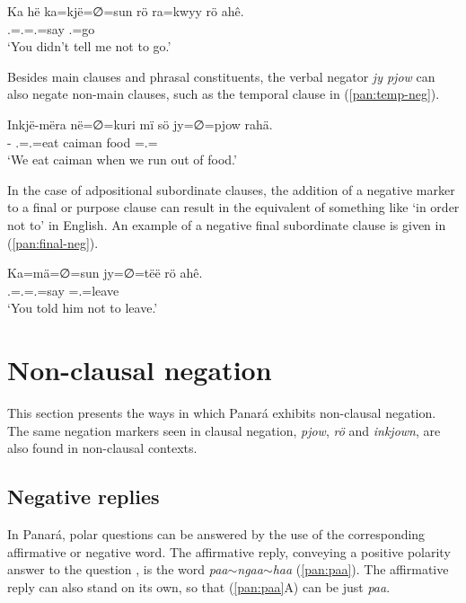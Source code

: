 \documentclass[output=paper,colorlinks,citecolor=brown,draft]{langscibook}
\begin{document}
 
\ea\label{pan:kwyy-ro}
    \gll Ka hë ka=kjë=∅=sun rö ra=kwyy rö ahê. \\
    \Ssg{} \Erg{} \Ssg.\Erg{}=\Fsg.\Dat{}=\Tsg.\Abs{}=say \Neg{} \Fsg.\Abs{}=go \Neg{} \Fnl{}  \\
    \glt `You didn't tell me not to go.' \\
\z

Besides main clauses and phrasal constituents, the verbal negator \textit{jy pjow} can also negate non-main clauses, such as the temporal clause in (\ref{pan:temp-neg}).

\ea\label{pan:temp-neg}
    \gll Inkjë-mëra në=∅=kuri mï sö jy=∅=pjow rahä.  \\ 
    \Fsg-\Pl{} \Fpl.\Erg{}=\Tsg.\Abs{}=eat caiman food \Intr{}=\Tsg.\Abs{}=\Neg{} \Ade{} \\
    \glt `We eat caiman when we run out of food.'\\
\z

In the case of adpositional subordinate clauses, the addition of a negative marker to a final or purpose clause can result in the equivalent of something like `in order not to' in English. An example of a negative final subordinate clause is given in (\ref{pan:final-neg}).

\ea\label{pan:final-neg}
    \gll Ka=mä=∅=sun jy=∅=tëë rö ahê. \\
    \Ssg.\Erg{}=\Tsg.\Dat{}=\Tsg.\Abs{}=say \Intr{}=\Tsg.\Abs{}=leave \Neg{} \Fnl{}{} \\
    \glt `You told him not to leave.' \\
\z

\section{Non-clausal negation}\label{pan:sec:non-clausal}

This section presents the ways in which Panará exhibits non-clausal negation. The same negation markers seen in clausal negation, \textit{pjow}, \textit{rö} and \textit{inkjown}, are also found in non-clausal contexts.

\subsection{Negative replies}\label{pan:sec:replies}

In Panará, polar questions can be answered by the use of the corresponding affirmative or negative word. The affirmative reply, conveying a positive polarity answer to the question \citep{Moser2018, EnfieldEtAl2019}, is the word \textit{paa}$\sim$\textit{ngaa}$\sim$\textit{haa} (\ref{pan:paa}). The affirmative reply can also stand on its own, so that (\ref{pan:paa}A) can be just \textit{paa}. 
\end{document}
